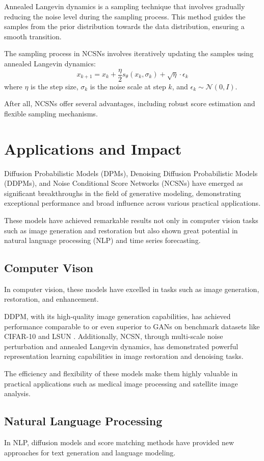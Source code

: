 \documentclass[sigconf,natbib=false]{acmart}
\begin{document}
Annealed Langevin dynamics is a sampling technique that involves gradually
reducing the noise level during the sampling process.
This method guides the samples from the prior distribution towards the data distribution,
ensuring a smooth transition.

The sampling process in NCSNs involves iteratively updating the samples
using annealed Langevin dynamics:
\[ x_{k+1} = x_k + \frac{\eta}{2} s_\theta(x_k, \sigma_k) + \sqrt{\eta} \cdot \epsilon_k \]
where \(\eta\) is the step size,
\(\sigma_k\) is the noise scale at step \(k\), and \(\epsilon_k \sim \mathcal{N}(0, I)\).

After all, NCSNs offer several advantages,
including robust score estimation and flexible sampling mechanisms.

\section{Applications and Impact}
Diffusion Probabilistic Models (DPMs), Denoising Diffusion Probabilistic Models (DDPMs),
and Noise Conditional Score Networks (NCSNs)
have emerged as significant breakthroughs in the field of generative modeling,
demonstrating exceptional performance and broad influence across various practical applications.

These models have achieved remarkable results not only in computer vision tasks
such as image generation and restoration
but also shown great potential in natural language processing (NLP)
and time series forecasting.

\subsection{Computer Vison}
In computer vision, these models have excelled in tasks such as image generation,
restoration, and enhancement.

DDPM, with its high-quality image generation capabilities,
has achieved performance comparable to or even superior to GANs on benchmark datasets
like CIFAR-10 and LSUN \cite{ho2020}.
Additionally, NCSN, through multi-scale noise perturbation and annealed Langevin dynamics,
has demonstrated powerful representation learning capabilities
in image restoration and denoising tasks.

The efficiency and flexibility of these models make them highly valuable
in practical applications such as medical image processing and satellite image analysis.

\subsection{Natural Language Processing}
In NLP, diffusion models and score matching methods have provided new approaches
for text generation and language modeling. \cite{li2022}
\end{document}
